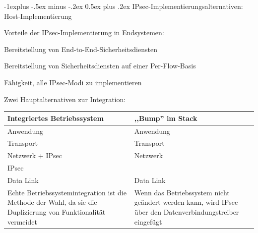 \documentclass[a4paper]{article}
\makeatletter
\renewcommand{\subsection}{\@startsection{subsection}{2}{0mm}%
 {-1explus -.5ex minus -.2ex}%
 {0.5ex plus .2ex}%
 {\normalfont\normalsize\bfseries}}
\makeatother
\begin{document}
\begin{multicols}{3}
      \subsection{IPsec-Implementierungsalternativen: Host-Implementierung}
      \begin{itemize*}
            \item Vorteile der IPsec-Implementierung in Endsystemen:
            \begin{itemize*}
                  \item Bereitstellung von End-to-End-Sicherheitsdiensten
                  \item Bereitstellung von Sicherheitsdiensten auf einer Per-Flow-Basis
                  \item Fähigkeit, alle IPsec-Modi zu implementieren
            \end{itemize*}
            \item Zwei Hauptalternativen zur Integration:
      \end{itemize*}
      \begin{tabular}{p{4cm}|p{4cm}}
            Integriertes Betriebssystem & ,,Bump'' im Stack                                                                                         \\\hline
            Anwendung                   & Anwendung                                                                                                 \\
            Transport                   & Transport                                                                                                 \\
            Netzwerk + IPsec            & Netzwerk                                                                                                  \\
            IPsec                       &                                                                                                           \\
            Data Link                   & Data Link                                                                                                 \\
            Echte Betriebssystemintegration ist die Methode der Wahl, da sie die Duplizierung von Funktionalität
            vermeidet                   & Wenn das Betriebssystem nicht geändert werden kann, wird IPsec über den Datenverbindungstreiber eingefügt
      \end{tabular}


\end{multicols}
\end{document}

